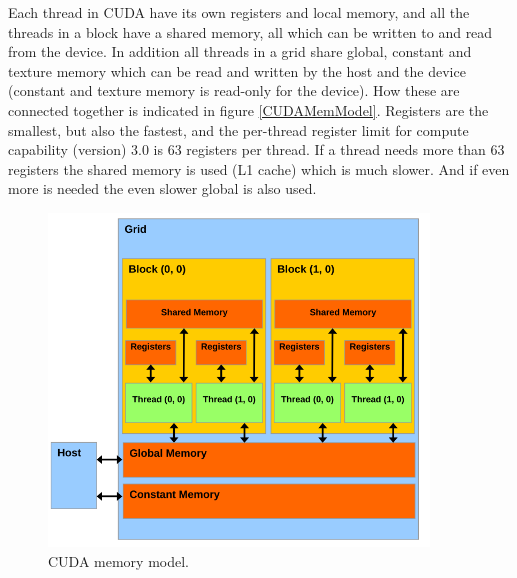 Each thread in CUDA have its own registers and local memory, and all the threads in a block have a shared memory, all which can be written to and read from the device. In addition all threads in a grid share global, constant and texture memory which can be read and written by the host and the device (constant and texture memory is read-only for the device). How these are connected together is indicated in figure \ref{CUDAMemModel}. Registers are the smallest, but also the fastest, and the per-thread register limit for compute capability (version) 3.0 is 63 registers per thread. If a thread needs more than 63 registers the shared memory is used (L1 cache) which is much slower. And if even more is needed the even slower global is also used.

\begin{figure}[h!]
\centering
\includegraphics[width=0.90\textwidth]{parallel/CUDAMemModel}
\caption{CUDA memory model.}
\label{CUDAMemModeldel}
\end{figure} 

